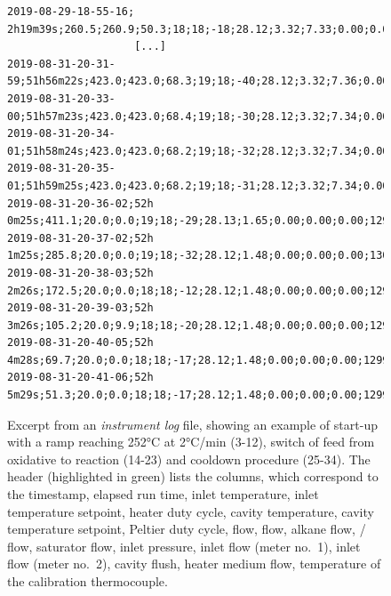 \documentclass[12pt]{article}
\begin{document}
\begin{landscape}
\begin{figure}[tbh]
\begin{lstlisting}[escapechar=£,
    linewidth=24cm]
2019-08-29-18-55-16; 2h19m39s;260.5;260.9;50.3;18;18;-18;28.12;3.32;7.33;0.00;0.00;1300.6;0.656;1.00;15;8;19.8
                    [...]
2019-08-31-20-31-59;51h56m22s;423.0;423.0;68.3;19;18;-40;28.12;3.32;7.36;0.00;0.00;1299.7;0.656;0.00;15;8;21.5
2019-08-31-20-33-00;51h57m23s;423.0;423.0;68.4;19;18;-30;28.12;3.32;7.34;0.00;0.00;1300.0;0.657;0.00;15;8;21.5
2019-08-31-20-34-01;51h58m24s;423.0;423.0;68.2;19;18;-32;28.12;3.32;7.34;0.00;0.00;1300.3;0.656;0.00;15;8;21.6
2019-08-31-20-35-01;51h59m25s;423.0;423.0;68.2;19;18;-31;28.12;3.32;7.34;0.00;0.00;1299.4;0.656;0.00;15;8;20.9
2019-08-31-20-36-02;52h 0m25s;411.1;20.0;0.0;19;18;-29;28.13;1.65;0.00;0.00;0.00;1294.4;1.260;24.43;15;8;21.2
2019-08-31-20-37-02;52h 1m25s;285.8;20.0;0.0;19;18;-32;28.12;1.48;0.00;0.00;0.00;1300.0;1.211;0.99;15;8;21.1
2019-08-31-20-38-03;52h 2m26s;172.5;20.0;0.0;18;18;-12;28.12;1.48;0.00;0.00;0.00;1299.7;1.210;0.99;15;8;21.3
2019-08-31-20-39-03;52h 3m26s;105.2;20.0;9.9;18;18;-20;28.12;1.48;0.00;0.00;0.00;1299.7;1.211;0.99;15;8;21.6
2019-08-31-20-40-05;52h 4m28s;69.7;20.0;0.0;18;18;-17;28.12;1.48;0.00;0.00;0.00;1299.7;1.211;1.00;15;8;21.8
2019-08-31-20-41-06;52h 5m29s;51.3;20.0;0.0;18;18;-17;28.12;1.48;0.00;0.00;0.00;1299.7;1.211;1.00;15;8;20.9
\end{lstlisting}
\centering
\caption{Excerpt from an \emph{instrument log} file, showing an example of start-up with a ramp reaching 252°C at 2°C/min (3-12), switch of feed from oxidative to reaction (14-23) and cooldown procedure (25-34). The header (highlighted in green) lists the columns, which correspond to the timestamp, elapsed run time, inlet temperature, inlet temperature setpoint, heater duty cycle, cavity temperature, cavity temperature setpoint, Peltier duty cycle,  flow,  flow, alkane flow, / flow, saturator flow, inlet pressure, inlet flow (meter no.~1), inlet flow (meter no.~2), cavity flush, heater medium flow, temperature of the calibration thermocouple. \label{fig:instlog}}
\end{figure}
\end{landscape}
\clearpage
\end{document}
